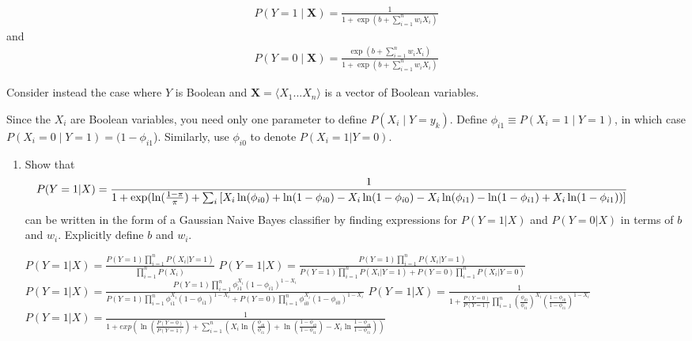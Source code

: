 \documentclass[11pt,addpoints,answers]{exam}
\newcommand{\Xv}{\mathbf{X}}
\begin{document}
\begin{questions}
\begin{align*}
    P(Y=1\mid\Xv)=\frac{1}{1+\exp(b+\sum_{i=1}^{n} w_iX_i)}
\end{align*}
and
\begin{align*}
    P(Y=0\mid\Xv)=\frac{\exp(b+\sum_{i=1}^{n} w_iX_i)}{1+\exp(b+\sum_{i=1}^{n} w_iX_i)}
\end{align*}

 Consider instead the case where $Y$ is Boolean and ${\Xv = \langle{X_{1}...X_{n}}}\rangle$ is a vector
of Boolean variables.


Since the $X_{i}$ are Boolean variables, you need only one parameter to define $P(X_{i}\mid{Y} = y_k)$. Define $\phi_{i1} \equiv P(X_{i} = 1\mid{Y = 1})$, in which case $P(X_{i} = 0\mid{Y = 1}) = (1-\phi_{i1}$). Similarly, use $\phi_{i0}$ to denote $P(X_{i} = 1|Y = 0)$. 

\begin{enumerate}
    \item Show that \footnotesize
        $$\hspace*{-15mm}P(Y=1|X) = \frac{1}{1+\exp(\ln(\frac{1-\pi}{\pi}) +\sum_i \left[X_i\ln(\phi_{i0}) + \ln(1-\phi_{i0}) - X_i\ln(1-\phi_{i0}) - X_i\ln(\phi_{i1}) - \ln(1-\phi_{i1}) + X_i\ln(1-\phi_{i1}))\right]}$$ 
        \normalsize
        can be written in the form of a Gaussian Naive Bayes classifier by finding expressions for $P(Y=1|X)$ and $P(Y=0|X)$ in terms of $b$ and $w_i$. Explicitly define $b$ and $w_i$.
        
        \begin{tcolorbox}[fit,height=10cm, blank, borderline={1pt}{-2pt},nobeforeafter]
$P(Y=1|X) = \frac{P(Y=1) \prod \limits_{i=1}^n P(X_i | Y = 1)}{\prod \limits_{i=1}^n P(X_i)}$\newline
$P(Y=1|X) = \frac{P(Y=1) \prod \limits_{i=1}^n P(X_i | Y = 1)}{P(Y=1) \prod \limits_{i=1}^n P(X_i | Y = 1) + P(Y=0) \prod \limits_{i=1}^n P(X_i | Y = 0)}$\newline
$P(Y=1|X) = \frac{P(Y=1) \prod \limits_{i=1}^n \phi_{i1}^{X_i}(1 - \phi_{i1})^{1 - X_i}}{P(Y=1) \prod \limits_{i=1}^n \phi_{i1}^{X_i}(1 - \phi_{i1})^{1 - X_i} + P(Y=0) \prod \limits_{i=1}^n \phi_{i0}^{X_i}(1 - \phi_{i0})^{1 - X_i}}$\newline    
$P(Y=1|X) = \frac{1}{1 + \frac{P(Y=0)}{P(Y=1)} \prod \limits_{i=1}^n (\frac{\phi_{i0}}{\phi_{i1}})^{X_i}(\frac{1 - \phi_{i0}}{1 - \phi_{i1}})^{1 - X_i}}$\newline
$P(Y=1|X) = \frac{1}{1 + exp \left(\ln(\frac{P(Y=0)}{P(Y=1)}) + \sum \limits_{i=1}^n (X_i \ln(\frac{\phi_{i0}}{\phi_{i1}}) + \ln(\frac{1 - \phi_{i0}}{1 - \phi_{i1}}) - X_i \ln\frac{1 - \phi_{i0}}{1 - \phi_{i1}})\right)}$\newline


\end{tcolorbox}
\end{enumerate}
\end{questions}
\end{document}
